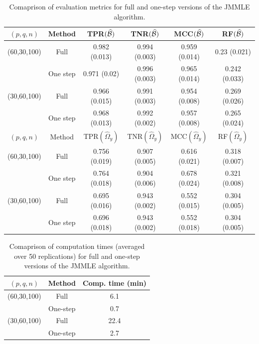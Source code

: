 \begin{table}
\centering
    \begin{tabular}{cccccc}
    \hline
    $(p,q,n)$     & Method         & TPR$(\widehat {{\cal{B}}})$            & TNR$(\widehat {{\cal{B}}})$            & MCC$(\widehat {{\cal{B}}})$ & RF$(\widehat {{\cal{B}}})$             \\\hline
    (60,30,100) & Full         & 0.982 (0.013) & 0.994 (0.003) & 0.959 (0.014)   & 0.23 (0.021)  \\
    ~           & One step     & 0.971 (0.02)  & 0.996 (0.003) & 0.965 (0.014)   & 0.242 (0.033) \\
    (30,60,100) & Full         & 0.966 (0.015) & 0.991 (0.003) & 0.954 (0.008)   & 0.269 (0.026) \\
    ~           & One step     & 0.968 (0.013) & 0.992 (0.002) & 0.957 (0.008)   & 0.265 (0.024) \\ \hline
    \hline
    $(p,q,n)$     & Method         & TPR$(\widehat \Omega_y)$            & TNR$(\widehat \Omega_y)$            & MCC$(\widehat \Omega_y)$ & RF$(\widehat \Omega_y)$            \\\hline
    (60,30,100) & Full         & 0.756 (0.019) & 0.907 (0.005)  & 0.616 (0.021)   & 0.318 (0.007) \\
    ~           & One step     & 0.764 (0.018) & 0.904 (0.006)  & 0.678 (0.024)   & 0.321 (0.008) \\
    (30,60,100) & Full         & 0.695 (0.016) & 0.943 (0.002)  & 0.552 (0.015)   & 0.304 (0.005) \\
    ~           & One step     & 0.696 (0.018) & 0.943 (0.002)  & 0.552 (0.018)   & 0.304 (0.005) \\\hline
    \end{tabular}
    \caption{Comaprison of evaluation metrics for full and one-step versions of the JMMLE algorithm.}
    \label{table:simtable41}
\end{table}

\begin{table}[t]
\centering
  \begin{tabular}{ccc}
    \hline
    $(p,q,n)$     & Method   & Comp. time (min) \\ \hline
    (60,30,100) & Full     & 6.1              \\ 
    ~           & One-step & 0.7              \\ \hline
    (30,60,100) & Full     & 22.4             \\ 
    ~           & One-step & 2.7              \\ \hline
    \end{tabular}
    \caption{Comaprison of computation times (averaged over 50 replications) for full and one-step versions of the JMMLE algorithm.}
    \label{table:simtable42}
\end{table}



